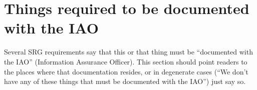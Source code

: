 %
%
%
%

\section{Things required to be documented with the IAO}
\label{DocumentedWithIAO}

Several SRG requirements say that this or that thing must be ``documented
with the IAO'' (Information Assurance Officer). This section should point
readers to the places where that documentation resides, or in degenerate
cases (``We don't have any of these things that must be documented with
the IAO'') just say so.

